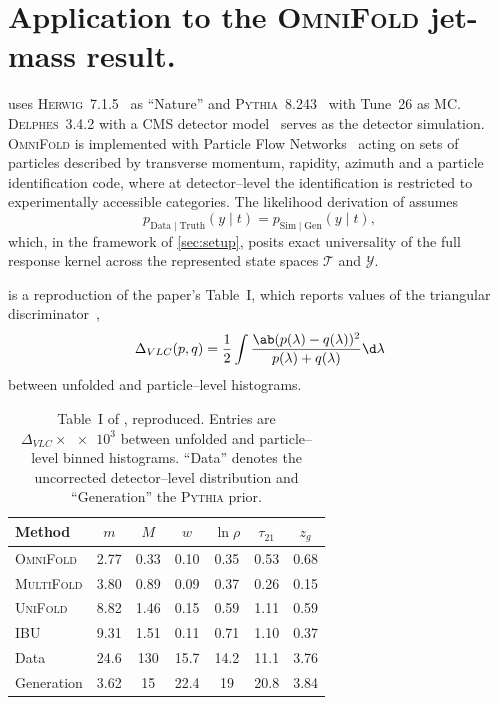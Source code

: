 \documentclass[12pt]{article}
\newcommand{\1}{\mathbbm{1}}
\renewcommand{\[}{\begin{equation}}
\renewcommand{\]}{\end{equation}}
\begin{document}
\section{Application to the \textsc{OmniFold} jet-mass result.}
\label{sec:omnifold}

    \textcite{Andreassen:2019cjw} uses \textsc{Herwig}~7.1.5~\cite{Bellm:2015jjp} as ``Nature'' and \textsc{Pythia}~8.243~\cite{Sjostrand:2014zea} with Tune~26 as MC.  \textsc{Delphes}~3.4.2 with a CMS detector model~\cite{deFavereau:2013fsa} serves as the detector simulation.
    \textsc{OmniFold} is implemented with Particle Flow Networks~\cite{Komiske:2018cqr} acting on sets of particles described by transverse momentum, rapidity, azimuth and a particle identification code, where at detector--level the identification is restricted to experimentally accessible categories.
    The likelihood derivation of \textcite{Andreassen:2019cjw} assumes
    \[
    \label{eq:omnifold-assumption}
        p_{\mathrm{Data\mid Truth}}(y\mid t)=p_{\mathrm{Sim\mid Gen}}(y\mid t),
    \]
    which, in the framework of \cref{sec:setup}, posits exact universality of the full response kernel across the represented state spaces \(\mathcal{T}\) and \(\mathcal{Y}\).

     is a reproduction of the paper's Table~I, which reports values of the triangular discriminator~\cite{Topsoe:2000},
    \[
        \Delta_{VLC}(p,q) = \frac12\int\frac{\ab(p(\lambda)-q(\lambda))^2}{p(\lambda)+q(\lambda)}\d\lambda
    \]
    between unfolded and particle--level histograms.

    \begin{table}
      \centering
      \caption{Table~I of \textcite{Andreassen:2019cjw}, reproduced.
      Entries are \(\Delta_{VLC}\times\num{e3}\) between unfolded and particle--level binned histograms.
      ``Data'' denotes the uncorrected detector--level distribution and ``Generation'' the \textsc{Pythia} prior.}
      \label{tab:omnifold}
      \begin{tabular}{lSSSSSS}
        \toprule
        Method & {\(m\)} & {\(M\)} & {\(w\)} & {\(\ln\rho\)} & {\(\tau_{21}\)} & {\(z_g\)}\\
        \midrule
        \textsc{OmniFold}  & 2.77 & 0.33 & 0.10 & 0.35 & 0.53 & 0.68\\
        \textsc{MultiFold} & 3.80 & 0.89 & 0.09 & 0.37 & 0.26 & 0.15\\
        \textsc{UniFold}   & 8.82 & 1.46 & 0.15 & 0.59 & 1.11 & 0.59\\
        IBU                & 9.31 & 1.51 & 0.11 & 0.71 & 1.10 & 0.37\\
        Data               & 24.6 & 130  & 15.7 & 14.2 & 11.1 & 3.76\\
        Generation         & 3.62 & 15   & 22.4 & 19   & 20.8 & 3.84\\
        \bottomrule
      \end{tabular}
    \end{table}
\end{document}
